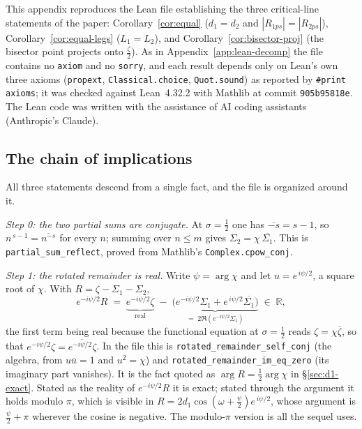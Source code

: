 \documentclass[11pt]{article}
\theoremstyle{definition}
\begin{document}
This appendix reproduces the Lean file establishing the three critical-line
statements of the paper: Corollary~\ref{cor:equal}
($d_1=d_2$ and $|R_{1ps}|=|R_{2ps}|$), Corollary~\ref{cor:equal-legs}
($L_1=L_2$), and Corollary~\ref{cor:bisector-proj} (the bisector point projects
onto $\tfrac{\zeta}{2}$). As in Appendix~\ref{app:lean-decomp} the file contains
no \texttt{axiom} and no \texttt{sorry}, and each result depends only on Lean's
own three axioms (\texttt{propext}, \texttt{Classical.choice},
\texttt{Quot.sound}) as reported by \texttt{\#print axioms}; it was checked
against Lean~4.32.2 with Mathlib at commit \texttt{905b95818e}. The Lean code was
written with the assistance of AI coding assistants (Anthropic's Claude).

\subsection{The chain of implications}

All three statements descend from a single fact, and the file is organized around
it.

\emph{Step 0: the two partial sums are conjugate.} At $\sigma=\tfrac12$ one has
$\overline{-s}=s-1$, so $n^{\,s-1}=\overline{n^{-s}}$ for every $n$; summing over
$n\le m$ gives $\Sigma_2=\chi\,\overline{\Sigma_1}$. This is
\texttt{partial\_sum\_reflect}, proved from Mathlib's \texttt{Complex.cpow\_conj}.

\emph{Step 1: the rotated remainder is real.} Write $\psi=\arg\chi$ and let
$u=e^{\,i\psi/2}$, a square root of $\chi$. With $R=\zeta-\Sigma_1-\Sigma_2$,
\begin{equation}\label{eq:lean-hinge}
e^{-i\psi/2}R
\;=\;
\underbrace{e^{-i\psi/2}\zeta}_{\text{real}}
\;-\;
\underbrace{\bigl(e^{-i\psi/2}\Sigma_1+e^{\,i\psi/2}\overline{\Sigma_1}\bigr)}_{=\;2\Re\left(e^{-i\psi/2}\Sigma_1\right)}
\;\in\;\mathbb{R},
\end{equation}
the first term being real because the functional equation at $\sigma=\tfrac12$
reads $\zeta=\chi\overline{\zeta}$, so that
$e^{-i\psi/2}\zeta=\overline{e^{-i\psi/2}\zeta}$. In the file this is
\texttt{rotated\_remainder\_self\_conj} (the algebra, from $u\bar u=1$ and
$u^2=\chi$) and \texttt{rotated\_remainder\_im\_eq\_zero} (its imaginary part
vanishes). It is the fact quoted as $\arg R=\tfrac12\arg\chi$ in
\S\ref{sec:d1-exact}. Stated as the reality of $e^{-i\psi/2}R$ it is exact;
stated through the argument it holds modulo $\pi$, which is visible in
$R=2d_1\cos(\omega+\tfrac\psi2)e^{\,i\psi/2}$, whose argument is
$\tfrac\psi2+\pi$ wherever the cosine is negative. The modulo-$\pi$ version is
all the sequel uses.
\end{document}
